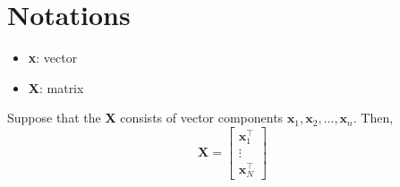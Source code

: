 \documentclass{article}
\begin{document}
\section{Notations}
\begin{itemize}
    \item \textbf{x}: vector
    \item \textbf{X}: matrix
\end{itemize}
Suppose that the \textbf{X} consists of vector components $\textbf{x}_1, \textbf{x}_2, \dots, \textbf{x}_n$. Then,
    \[
        \mathbf{X} =
        \begin{bmatrix}
            \mathbf{x}_1^\top \\ \vdots \\ \mathbf{x}_N^\top
        \end{bmatrix}
    \]
\end{document}
